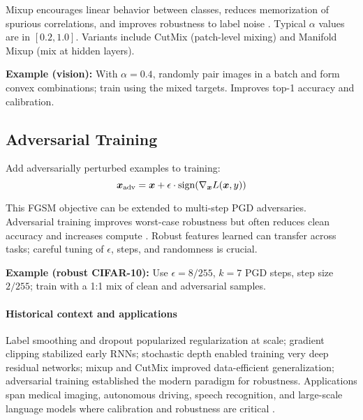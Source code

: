 Mixup encourages linear behavior between classes, reduces memorization of spurious correlations, and improves robustness to label noise \cite{Zhang2018Mixup}. Typical $\alpha$ values are in $[0.2, 1.0]$. Variants include CutMix (patch-level mixing) \cite{Yun2019CutMix} and Manifold Mixup (mix at hidden layers).

\begin{example}
\textbf{Example (vision):} With $\alpha=0.4$, randomly pair images in a batch and form convex combinations; train using the mixed targets. Improves top-1 accuracy and calibration.
\end{example}

\subsection{Adversarial Training}

Add adversarially perturbed examples to training:
\begin{equation}
\boldsymbol{x}_{\text{adv}} = \boldsymbol{x} + \epsilon \cdot \text{sign}(\nabla_{\boldsymbol{x}} L(\boldsymbol{x}, y))
\end{equation}

This FGSM objective can be extended to multi-step PGD adversaries. Adversarial training improves worst-case robustness but often reduces clean accuracy and increases compute \cite{Goodfellow2014}. Robust features learned can transfer across tasks; careful tuning of $\epsilon$, steps, and randomness is crucial.

\begin{example}
\textbf{Example (robust CIFAR-10):} Use $\epsilon=8/255$, $k=7$ PGD steps, step size $2/255$; train with a 1:1 mix of clean and adversarial samples.
\end{example}

\paragraph{Historical context and applications} Label smoothing and dropout popularized regularization at scale; gradient clipping stabilized early RNNs; stochastic depth enabled training very deep residual networks; mixup and CutMix improved data-efficient generalization; adversarial training established the modern paradigm for robustness. Applications span medical imaging, autonomous driving, speech recognition, and large-scale language models where calibration and robustness are critical \cite{GoodfellowEtAl2016,He2016,Ioffe2015}.

